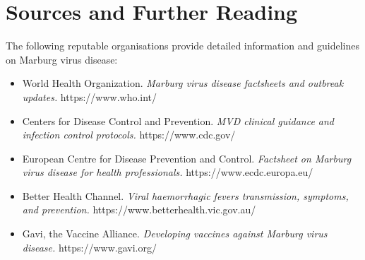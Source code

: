 \section*{Sources and Further Reading}
The following reputable organisations provide detailed information and guidelines on Marburg virus disease:
\begin{itemize}
    \item World Health Organization. \textit{Marburg virus disease factsheets and outbreak updates.} https://www.who.int/
    \item Centers for Disease Control and Prevention. \textit{MVD clinical guidance and infection control protocols.} https://www.cdc.gov/
    \item European Centre for Disease Prevention and Control. \textit{Factsheet on Marburg virus disease for health professionals.} https://www.ecdc.europa.eu/
    \item Better Health Channel. \textit{Viral haemorrhagic fevers transmission, symptoms, and prevention.} https://www.betterhealth.vic.gov.au/
    \item Gavi, the Vaccine Alliance. \textit{Developing vaccines against Marburg virus disease.} https://www.gavi.org/
\end{itemize}

\clearpage
